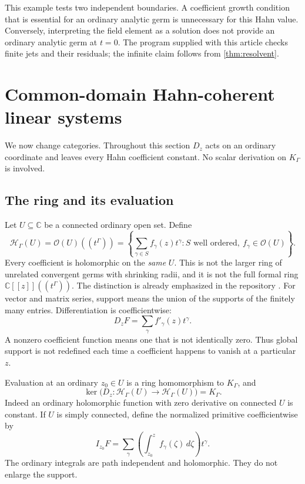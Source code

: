 \documentclass[11pt,letterpaper]{article}
\numberwithin{equation}{section}
\theoremstyle{definition}
\theoremstyle{remark}
\newcommand{\C}{\mathbb C}
\newcommand{\OO}{\mathcal O}
\newcommand{\HH}{\mathscr H}
\begin{document}
This example tests two independent boundaries. A coefficient growth
condition that is essential for an ordinary analytic germ is unnecessary
for this Hahn value. Conversely, interpreting the field element as a
solution does not provide an ordinary analytic germ at $t=0$.
The program supplied with this article checks finite jets and their
residuals; the infinite claim follows from \cref{thm:resolvent}.

\section{Common-domain Hahn-coherent linear systems}
\label{sec:coherent}

We now change categories. Throughout this section $D_z$ acts on an ordinary
coordinate and leaves every Hahn coefficient constant. No scalar derivation
on $K_\Gamma$ is involved.

\subsection{The ring and its evaluation}
Let $U\subseteq\C$ be a connected ordinary open set. Define
\[
 \HH_\Gamma(U)=\OO(U)((t^\Gamma))
 =\left\{\sum_{\gamma\in S}f_\gamma(z)t^\gamma:
 S\text{ well ordered},\ f_\gamma\in\OO(U)\right\}.
\]
Every coefficient is holomorphic on the \emph{same} $U$. This is not the
larger ring of unrelated convergent germs with shrinking radii, and it is
not the full formal ring $\C[[z]]((t^\Gamma))$. The distinction is already
emphasized in the repository \cite{RepoCatalogue,RepoAnalysis}.
For vector and matrix series, support means the union of the supports of
the finitely many entries. Differentiation is coefficientwise:
\[
 D_zF=\sum_\gamma f'_\gamma(z)t^\gamma.
\]
A nonzero coefficient function means one that is not identically zero.
Thus global support is not redefined each time a coefficient happens to
vanish at a particular $z$.

Evaluation at an ordinary $z_0\in U$ is a ring homomorphism to $K_\Gamma$,
and
\begin{equation}\label{eq:coherentconstants}
 \ker\bigl(D_z:\HH_\Gamma(U)\to\HH_\Gamma(U)\bigr)=K_\Gamma.
\end{equation}
Indeed an ordinary holomorphic function with zero derivative on connected
$U$ is constant. If $U$ is simply connected, define the normalized primitive
coefficientwise by
\[
 I_{z_0}F=\sum_\gamma
 \left(\int_{z_0}^{z}f_\gamma(\zeta)\,d\zeta\right)t^\gamma.
\]
The ordinary integrals are path independent and holomorphic. They do not
enlarge the support.
\end{document}
